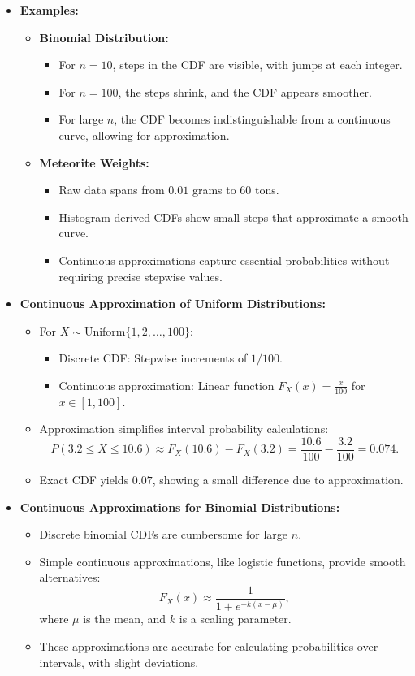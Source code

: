 \documentclass{article}
\begin{document}
\begin{itemize}
  \item \textbf{Examples:}
    \begin{itemize}
      \item \textbf{Binomial Distribution:}
        \begin{itemize}
          \item For $n = 10$, steps in the CDF are visible, with jumps at each integer.
          \item For $n = 100$, the steps shrink, and the CDF appears smoother.
          \item For large $n$, the CDF becomes indistinguishable from a continuous curve, allowing for approximation.
        \end{itemize}
      \item \textbf{Meteorite Weights:}
        \begin{itemize}
          \item Raw data spans from $0.01$ grams to $60$ tons.
          \item Histogram-derived CDFs show small steps that approximate a smooth curve.
          \item Continuous approximations capture essential probabilities without requiring precise stepwise values.
        \end{itemize}
    \end{itemize}

  \item \textbf{Continuous Approximation of Uniform Distributions:}
    \begin{itemize}
      \item For $X \sim \text{Uniform}\{1, 2, \dots, 100\}$:
        \begin{itemize}
          \item Discrete CDF: Stepwise increments of $1/100$.
          \item Continuous approximation: Linear function $F_X(x) = \frac{x}{100}$ for $x \in [1, 100]$.
        \end{itemize}
      \item Approximation simplifies interval probability calculations:
        \[
          P(3.2 \leq X \leq 10.6) \approx F_X(10.6) - F_X(3.2) = \frac{10.6}{100} - \frac{3.2}{100} = 0.074.
        \]
      \item Exact CDF yields $0.07$, showing a small difference due to approximation.
    \end{itemize}

  \item \textbf{Continuous Approximations for Binomial Distributions:}
    \begin{itemize}
      \item Discrete binomial CDFs are cumbersome for large $n$.
      \item Simple continuous approximations, like logistic functions, provide smooth alternatives:
        \[
          F_X(x) \approx \frac{1}{1 + e^{-k(x - \mu)}},
        \]
        where $\mu$ is the mean, and $k$ is a scaling parameter.
      \item These approximations are accurate for calculating probabilities over intervals, with slight deviations.
    \end{itemize}


\end{itemize}
\end{document}
